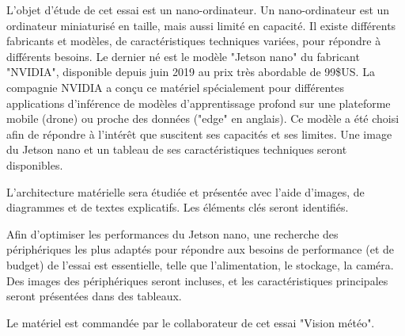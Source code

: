 \par L'objet d'étude de cet essai est un nano-ordinateur. Un nano-ordinateur est un ordinateur miniaturisé en taille, mais aussi limité en capacité. Il existe différents fabricants et modèles, de caractéristiques techniques variées, pour répondre à différents besoins. Le dernier né est le modèle "Jetson nano" du fabricant "NVIDIA", disponible depuis juin 2019 au prix très abordable de 99\$US. La compagnie NVIDIA a conçu ce matériel spécialement pour différentes applications d'inférence de modèles d'apprentissage profond sur une plateforme mobile (drone) ou proche des données ("edge" en anglais). Ce modèle a été choisi afin de répondre à l'intérêt que suscitent ses capacités et ses limites. Une image du Jetson nano et un tableau de ses caractéristiques techniques seront disponibles. 
\par L'architecture matérielle sera étudiée et présentée avec l'aide d'images, de diagrammes et de textes explicatifs. Les éléments clés seront identifiés.
\par Afin d'optimiser les performances du Jetson nano, une recherche des périphériques les plus adaptés pour répondre aux besoins de performance (et de budget) de l'essai est essentielle, telle que l'alimentation, le stockage, la caméra. Des images des périphériques seront incluses, et les caractéristiques principales seront présentées dans des tableaux.
\par Le matériel est commandée par le collaborateur de cet essai "Vision météo".